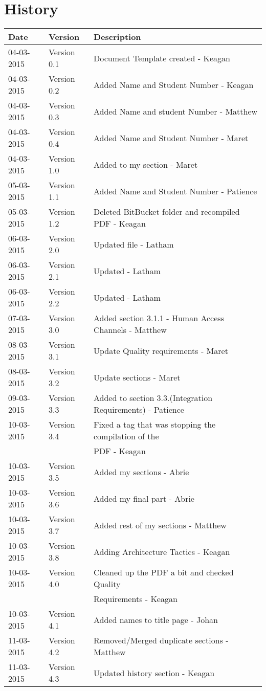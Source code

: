 \documentclass[12pt]{article}
\begin{document}


\section{History}
\begin{tabular}{|l|l|l|}
\hline
Date & Version & Description\\
\hline
04-03-2015 & Version 0.1 & Document Template created - Keagan\\
\hline
04-03-2015 & Version 0.2 & Added Name and Student Number - Keagan\\
\hline
04-03-2015 & Version 0.3 & Added Name and student Number - Matthew\\
\hline
04-03-2015 & Version 0.4 & Added Name and Student Number - Maret\\
\hline
04-03-2015 & Version 1.0 & Added to my section - Maret\\
\hline
05-03-2015 & Version 1.1 & Added Name and Student Number - Patience\\
\hline
05-03-2015 & Version 1.2 & Deleted BitBucket folder and recompiled PDF - Keagan\\
\hline
06-03-2015 & Version 2.0 & Updated file - Latham\\
\hline
06-03-2015 & Version 2.1 & Updated - Latham\\
\hline
06-03-2015 & Version 2.2 & Updated - Latham\\
\hline
07-03-2015 & Version 3.0 & Added section 3.1.1 - Human Access Channels - Matthew\\
\hline
08-03-2015 & Version 3.1 & Update Quality requirements - Maret\\
\hline
08-03-2015 & Version 3.2 & Update sections - Maret\\
\hline
09-03-2015 & Version 3.3 & Added to section 3.3.(Integration Requirements) - Patience\\
\hline
10-03-2015 & Version 3.4 & Fixed a tag that was stopping the compilation of the \\&&PDF - Keagan\\
\hline
10-03-2015 & Version 3.5 & Added my sections - Abrie\\
\hline
10-03-2015 & Version 3.6 & Added my final part - Abrie\\
\hline
10-03-2015 & Version 3.7 & Added rest of my sections - Matthew\\
\hline
10-03-2015 & Version 3.8 & Adding Architecture Tactics - Keagan\\
\hline
10-03-2015 & Version 4.0 & Cleaned up the PDF a bit and checked Quality \\&&Requirements - Keagan\\
\hline
10-03-2015 & Version 4.1 & Added names to title page - Johan\\
\hline
11-03-2015 & Version 4.2 & Removed/Merged duplicate sections - Matthew\\
\hline
11-03-2015 & Version 4.3 & Updated history section - Keagan\\
\hline



\end{tabular}
\end{document}
